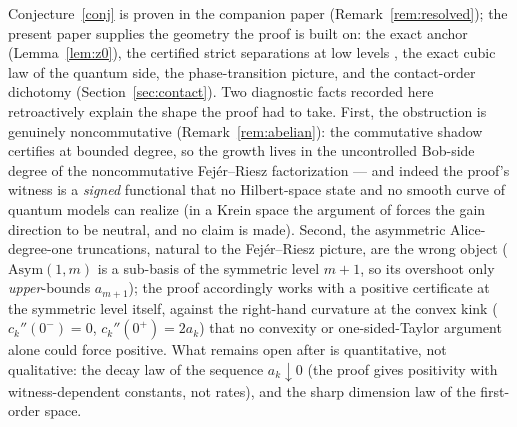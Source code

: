 \documentclass[11pt]{article}
\begin{document}
Conjecture~\ref{conj} is proven in the companion paper \cite{proof}
(Remark~\ref{rem:resolved}); the present paper supplies the geometry the proof
is built on: the exact anchor (Lemma~\ref{lem:z0}), the certified strict
separations at low levels \cite{sep}, the exact cubic law of the quantum side,
the phase-transition picture, and the contact-order dichotomy
(Section~\ref{sec:contact}). Two diagnostic facts recorded here retroactively
explain the shape the proof had to take. First, the obstruction is genuinely
noncommutative (Remark~\ref{rem:abelian}): the commutative shadow certifies at
bounded degree, so the growth lives in the uncontrolled Bob-side degree of the
noncommutative Fej\'er--Riesz factorization --- and indeed the proof's witness
is a \emph{signed} functional that no Hilbert-space state and no smooth
curve of quantum models can realize (in a Krein space the argument of
\cite{proof} forces the gain direction to be neutral, and no claim is
made). Second, the asymmetric
Alice-degree-one truncations, natural to the Fej\'er--Riesz picture, are the
wrong object ($\mathrm{Asym}(1,m)$ is a sub-basis of the symmetric level
$m{+}1$, so its overshoot only \emph{upper}-bounds $a_{m+1}$); the proof
accordingly works with a positive certificate at the symmetric level itself,
against the right-hand curvature at the convex kink ($c_k''(0^-)=0$,
$c_k''(0^+)=2a_k$) that no convexity or one-sided-Taylor argument alone could
force positive. What remains open after \cite{proof} is quantitative, not
qualitative: the decay law of the sequence $a_k\downarrow0$ (the proof gives
positivity with witness-dependent constants, not rates), and the sharp
dimension law of the first-order space.
\end{document}
